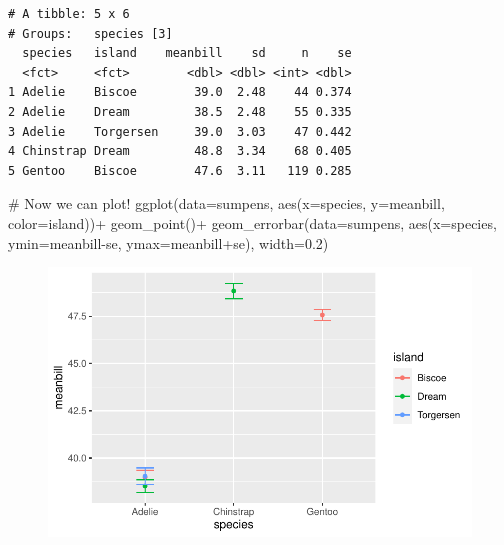 \documentclass[
  letterpaper,
  DIV=11,
  numbers=noendperiod]{scrartcl}
\newenvironment{Shaded}{\begin{snugshade}}{\end{snugshade}}
\newcommand{\AttributeTok}[1]{\textcolor[rgb]{0.40,0.45,0.13}{#1}}
\newcommand{\CommentTok}[1]{\textcolor[rgb]{0.37,0.37,0.37}{#1}}
\newcommand{\FloatTok}[1]{\textcolor[rgb]{0.68,0.00,0.00}{#1}}
\newcommand{\FunctionTok}[1]{\textcolor[rgb]{0.28,0.35,0.67}{#1}}
\newcommand{\NormalTok}[1]{\textcolor[rgb]{0.00,0.23,0.31}{#1}}
\newcommand{\SpecialCharTok}[1]{\textcolor[rgb]{0.37,0.37,0.37}{#1}}
\begin{document}
\begin{verbatim}
# A tibble: 5 x 6
# Groups:   species [3]
  species   island    meanbill    sd     n    se
  <fct>     <fct>        <dbl> <dbl> <int> <dbl>
1 Adelie    Biscoe        39.0  2.48    44 0.374
2 Adelie    Dream         38.5  2.48    55 0.335
3 Adelie    Torgersen     39.0  3.03    47 0.442
4 Chinstrap Dream         48.8  3.34    68 0.405
5 Gentoo    Biscoe        47.6  3.11   119 0.285
\end{verbatim}

\begin{Shaded}
\begin{Highlighting}[]
\CommentTok{\# Now we can plot! }
\FunctionTok{ggplot}\NormalTok{(}\AttributeTok{data=}\NormalTok{sumpens, }\FunctionTok{aes}\NormalTok{(}\AttributeTok{x=}\NormalTok{species, }\AttributeTok{y=}\NormalTok{meanbill, }\AttributeTok{color=}\NormalTok{island))}\SpecialCharTok{+}
  \FunctionTok{geom\_point}\NormalTok{()}\SpecialCharTok{+}
  \FunctionTok{geom\_errorbar}\NormalTok{(}\AttributeTok{data=}\NormalTok{sumpens, }\FunctionTok{aes}\NormalTok{(}\AttributeTok{x=}\NormalTok{species, }\AttributeTok{ymin=}\NormalTok{meanbill}\SpecialCharTok{{-}}\NormalTok{se, }\AttributeTok{ymax=}\NormalTok{meanbill}\SpecialCharTok{+}\NormalTok{se), }\AttributeTok{width=}\FloatTok{0.2}\NormalTok{)}
\end{Highlighting}
\end{Shaded}

\begin{figure}[H]

{\centering \includegraphics{basic_graphs_files/figure-pdf/unnamed-chunk-18-1.pdf}

}

\end{figure}
\end{document}
